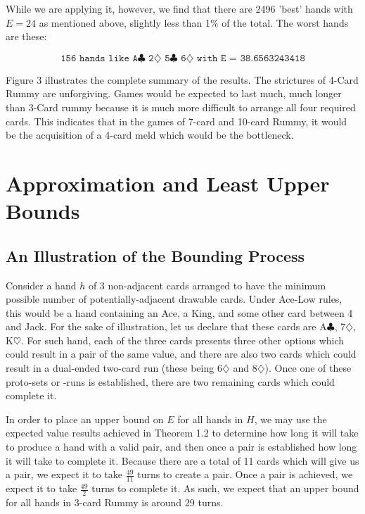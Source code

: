 \documentclass[paper=a4, fontsize=11pt,twoside]{report}   %
\begin{document}
While we are applying it, however, we find that there are 2496 'best' hands with $E=24$ as mentioned above, slightly less than 1$\%$ of the total. The worst hands are these:

$$\texttt{156 hands like A$\clubsuit$ 2$\diamondsuit$ 5$\clubsuit$ 6$\diamondsuit$ with E = 38.6563243418}$$

Figure 3 illustrates the complete summary of the results. The strictures of 4-Card Rummy are unforgiving. Games would be expected to last much, much longer than 3-Card rummy because it is much more difficult to arrange all four required cards. This indicates that in the games of 7-card and 10-card Rummy, it would be the acquisition of a 4-card meld which would be the bottleneck.

\chapter{Approximation and Least Upper Bounds}

\section{An Illustration of the Bounding Process}

Consider a hand $h$ of 3 non-adjacent cards arranged to have the minimum possible number of potentially-adjacent drawable cards. Under Ace-Low rules, this would be a hand containing an Ace, a King, and some other card between 4 and Jack. For the sake of illustration, let us declare that these cards are A$\clubsuit$, 7$\diamondsuit$, K$\heartsuit$. For such hand, each of the three cards presents three other options which could result in a pair of the same value, and there are also two cards which could result in a dual-ended two-card run (these being 6$\diamondsuit$ and 8$\diamondsuit$). Once one of these proto-sets or -runs is established, there are two remaining cards which could complete it.

In order to place an upper bound on $E$ for all hands in $H$, we may use the expected value results achieved in Theorem 1.2 to determine how long it will take to produce a hand with a valid pair, and then once a pair is established how long it will take to complete it. Because there are a total of 11 cards which will give us a pair, we expect it to take $\frac{49}{11}$ turns to create a pair. Once a pair is achieved, we expect it to take $\frac{49}{2}$ turns to complete it. As such, we expect that an upper bound for all hands in 3-card Rummy is around 29 turns.
\end{document}
